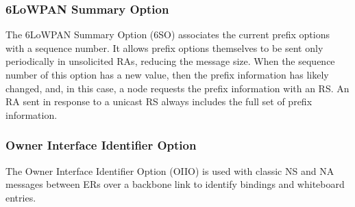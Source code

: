\subsubsection{6LoWPAN Summary Option}\label{nd.option.summary}
The 6LoWPAN Summary Option (6SO) associates the current prefix options with a sequence number. It allows prefix options themselves to be sent only periodically in unsolicited RAs, reducing the message size. When the sequence number of this option has a new value, then the prefix information has likely changed, and, in this case, a node requests the prefix information with an RS. An RA sent in response to a unicast RS always includes the full set of prefix information.

\subsubsection{Owner Interface Identifier Option}\label{sec:nd.oiio}
The Owner Interface Identifier Option (OIIO) is used with classic NS and NA messages between ERs over a backbone link to identify bindings and whiteboard entries.
